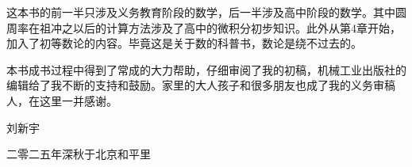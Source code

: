 \documentclass[b5paper]{ctexart}
\begin{document}
这本书的前一半只涉及义务教育阶段的数学，后一半涉及高中阶段的数学。其中圆周率在祖冲之以后的计算方法涉及了高中的微积分初步知识。此外从第4章开始，加入了初等数论的内容。毕竟这是关于数的科普书，数论是绕不过去的。

本书成书过程中得到了常成的大力帮助，仔细审阅了我的初稿，机械工业出版社的编辑给了我不断的支持和鼓励。家里的大人孩子和很多朋友也成了我的义务审稿人，在这里一并感谢。

\vspace{15mm}

刘新宇

二零二五年深秋于北京和平里


\ifx\wholebook\relax \else

\expandafter\enddocument

\fi
\end{document}
